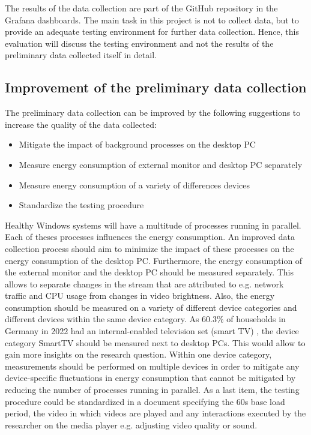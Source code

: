 The results of the data collection are part of the GitHub repository in the Grafana dashboards. The main task in this project is not to collect data, but to provide an adequate testing environment for further data collection. Hence, this evaluation will discuss the testing environment and not the results of the preliminary data collected itself in detail. 

\subsection{Improvement of the preliminary data collection}
The preliminary data collection can be improved by the following suggestions to increase the quality of the data collected: 

\begin{itemize}
  \item Mitigate the impact of background processes on the desktop PC
  \item Measure energy consumption of external monitor and desktop PC separately 
  \item Measure energy consumption of a variety of differences devices 
  \item Standardize the testing procedure
\end{itemize}

Healthy Windows systems will have a multitude of processes running in parallel. Each of theses processes influences the energy consumption. An improved data collection process should aim to minimize the impact of these processes on the energy consumption of the desktop PC. Furthermore, the energy consumption of the external monitor and the desktop PC should be measured separately. This allows to separate changes in the stream that are attributed to e.g. network traffic and CPU usage from changes in video brightness. Also, the energy consumption should be measured on a variety of different device categories and different devices within the same device category. As 60.3\% of households in Germany in 2022 had an internal-enabled television set (smart TV) \cite{medienanstalten2020}, the device category SmartTV should be measured next to desktop PCs. This would allow to gain more insights on the research question. Within one device category, measurements should be performed on multiple devices in order to mitigate any device-specific fluctuations in energy consumption that cannot be mitigated by reducing the number of processes running in parallel. As a last item, the testing procedure could be standardized in a document specifying the 60s base load period, the video in which videos are played and any interactions executed by the researcher on the media player e.g. adjusting video quality or sound. 


